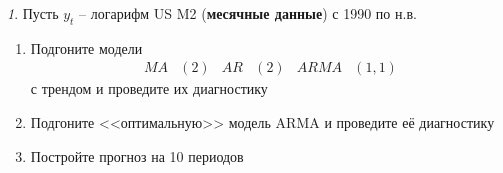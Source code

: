 \documentclass[12pt]{article}
\theoremstyle{remark}
\newtheorem{exercise}{}[subsection]
\begin{document}
\begin{exercise}
Пусть \(y_t\) -- логарифм US M2 (\textbf{месячные данные}) с 1990 по н.в.
\begin{enumerate}
\item Подгоните модели 
	\begin{align*}
		MA&(2) & AR&(2) & ARMA&(1,1) 
	\end{align*} 
	с трендом и проведите их диагностику
	\item Подгоните <<оптимальную>> модель ARMA и проведите её диагностику
	\item Постройте прогноз на 10 периодов
\end{enumerate}
\end{exercise}



\end{document}
